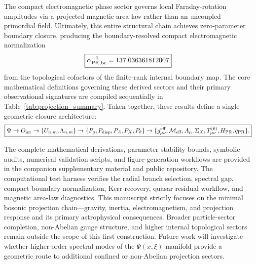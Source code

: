 \documentclass[11pt]{article}
\begin{document}
The compact electromagnetic phase sector governs local Faraday-rotation amplitudes via a projected magnetic area law rather than an uncoupled primordial field. Ultimately, this entire structural chain achieves zero-parameter boundary closure, producing the boundary-resolved compact electromagnetic normalization 
\begin{equation}
\boxed{
\alpha_{\rm PR,bc}^{-1}=137.036361812007    
}
\end{equation}
from the topological cofactors of the finite-rank internal boundary map. The core mathematical definitions governing these derived sectors and their primary observational signatures are compiled sequentially in Table~\ref{tab:projection_summary}. Taken together, these results define a single geometric closure architecture:
\begin{equation}
\boxed{
\Psi
\rightarrow
O_{\rm int}
\rightarrow
\{U_{n,m},\Lambda_{n,m}\}
\rightarrow
\{P_g,P_{\rm disp},P_A,P_X,P_\theta\}
\rightarrow
\{g_{\mu\nu}^{\rm eff},\mathcal M_{\rm eff},A_\mu,\Sigma_X,
T_{\mu\nu}^{(\theta)},H_{\rm PR},q_{\rm PR}\}.
}
\end{equation}

The complete mathematical derivations, parameter stability bounds, symbolic audits, numerical validation scripts, and figure-generation workflows are provided in the companion supplementary material and public repository. The computational test harness verifies the radial branch selection, spectral gap, compact boundary normalization, Kerr recovery, quasar residual workflow, and magnetic area-law diagnostics. This manuscript strictly focuses on the minimal bosonic projection chain—gravity, inertia, electromagnetism, and projection response and its primary astrophysical consequences. Broader particle-sector completion, non-Abelian gauge structure, and higher internal topological sectors remain outside the scope of this first construction. Future work will investigate whether higher-order spectral modes of the \(\Psi(x,\xi)\) manifold provide a geometric route to additional confined or non-Abelian projection sectors.
\end{document}
